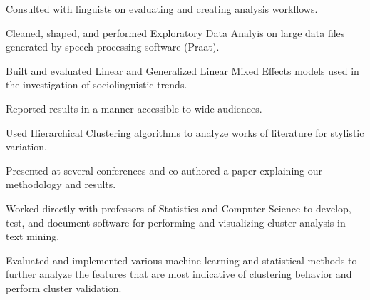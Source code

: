 \documentclass[letterpaper]{deedy-resume} %
\begin{document}
\begin{minipage}[t]{0.63\textwidth}

\begin{tightitemize}
\item Consulted with linguists on evaluating and creating analysis workflows.
\item Cleaned, shaped, and performed Exploratory Data Analyis on
  large data files generated by speech-processing software (Praat).
\item Built and evaluated Linear and Generalized Linear Mixed Effects
  models used in the
  investigation of sociolinguistic trends.
\item Reported results in a manner accessible to wide audiences.
\end{tightitemize}

\sectionspace %


\begin{tightitemize}
\item Used Hierarchical Clustering algorithms to analyze
  works of literature  for stylistic variation.
\item Presented at several conferences and co-authored a paper
  explaining our methodology and results.
\end{tightitemize}

\sectionspace %


\begin{tightitemize}
\item Worked directly with professors of Statistics and Computer Science to
  develop, test, and document software for performing and visualizing
  cluster analysis in text mining.
\item Evaluated and implemented various machine learning and statistical
  methods to further analyze the features that are most indicative of
  clustering behavior and perform cluster validation.
\end{tightitemize}


\end{minipage}
\end{document}
